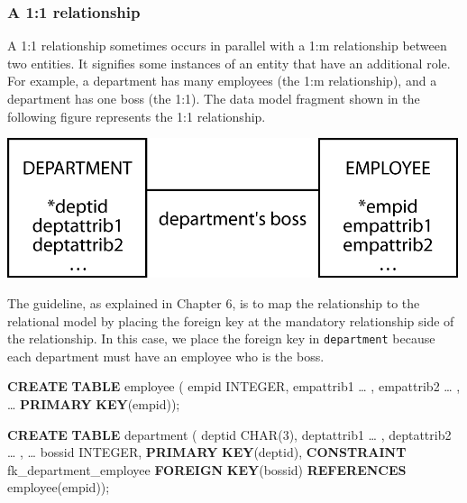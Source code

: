 \documentclass[
]{article}
\newenvironment{Shaded}{\begin{snugshade}}{\end{snugshade}}
\newcommand{\DataTypeTok}[1]{\textcolor[rgb]{0.13,0.29,0.53}{#1}}
\newcommand{\DecValTok}[1]{\textcolor[rgb]{0.00,0.00,0.81}{#1}}
\newcommand{\KeywordTok}[1]{\textcolor[rgb]{0.13,0.29,0.53}{\textbf{#1}}}
\newcommand{\NormalTok}[1]{#1}
\begin{document}
\hypertarget{a-11-relationship}{%
\subsubsection*{A 1:1 relationship}\label{a-11-relationship}}

A 1:1 relationship sometimes occurs in parallel with a 1:m relationship
between two entities. It signifies some instances of an entity that have
an additional role. For example, a department has many employees (the
1:m relationship), and a department has one boss (the 1:1). The data
model fragment shown in the following figure represents the 1:1
relationship.

\includegraphics[width=5.20833in,height=\textheight]{Figures/Reference 1/r1-dept-emp.png}

The guideline, as explained in Chapter 6, is to map the relationship to
the relational model by placing the foreign key at the mandatory
relationship side of the relationship. In this case, we place the
foreign key in \texttt{department} because each department must have an
employee who is the boss.

\begin{Shaded}
\begin{Highlighting}[]
\KeywordTok{CREATE} \KeywordTok{TABLE}\NormalTok{ employee (}
\NormalTok{    empid       }\DataTypeTok{INTEGER}\NormalTok{,}
\NormalTok{    empattrib1      … ,}
\NormalTok{    empattrib2      … ,}
\NormalTok{    …}
        \KeywordTok{PRIMARY} \KeywordTok{KEY}\NormalTok{(empid));}
\end{Highlighting}
\end{Shaded}

\begin{Shaded}
\begin{Highlighting}[]
\KeywordTok{CREATE} \KeywordTok{TABLE}\NormalTok{ department (}
\NormalTok{    deptid      }\DataTypeTok{CHAR}\NormalTok{(}\DecValTok{3}\NormalTok{),}
\NormalTok{    deptattrib1     … ,}
\NormalTok{    deptattrib2     … ,}
\NormalTok{    …}
\NormalTok{    bossid }\DataTypeTok{INTEGER}\NormalTok{,}
        \KeywordTok{PRIMARY} \KeywordTok{KEY}\NormalTok{(deptid),}
        \KeywordTok{CONSTRAINT}\NormalTok{ fk\_department\_employee}
            \KeywordTok{FOREIGN} \KeywordTok{KEY}\NormalTok{(bossid) }\KeywordTok{REFERENCES}\NormalTok{ employee(empid));}
\end{Highlighting}
\end{Shaded}
\end{document}
